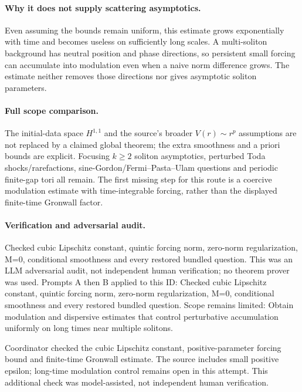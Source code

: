 \documentclass[11pt]{article}
\begin{document}
\paragraph{Why it does not supply scattering asymptotics.}Even assuming the bounds remain uniform, this estimate grows exponentially with time and becomes useless on sufficiently long scales. A multi-soliton background has neutral position and phase directions, so persistent small forcing can accumulate into modulation even when a naive norm difference grows. The estimate neither removes those directions nor gives asymptotic soliton parameters.
\paragraph{Full scope comparison.}The initial-data space \(H^{1,1}\) and the source's broader \(V(r)\sim r^p\) assumptions are not replaced by a claimed global theorem; the extra smoothness and a priori bounds are explicit. Focusing \(k\ge2\) soliton asymptotics, perturbed Toda shocks/rarefactions, sine-Gordon/Fermi--Pasta--Ulam questions and periodic finite-gap tori all remain. The first missing step for this route is a coercive modulation estimate with time-integrable forcing, rather than the displayed finite-time Gronwall factor.

\paragraph{Verification and adversarial audit.}
Checked cubic Lipschitz constant, quintic forcing norm, zero-norm regularization, M=0, conditional smoothness and every restored bundled question. This was an LLM adversarial audit, not independent human verification; no theorem prover was used. Prompts A then B applied to this ID: Checked cubic Lipschitz constant, quintic forcing norm, zero-norm regularization, M=0, conditional smoothness and every restored bundled question. Scope remains limited: Obtain modulation and dispersive estimates that control perturbative accumulation uniformly on long times near multiple solitons.

Coordinator checked the cubic Lipschitz constant, positive-parameter forcing bound and finite-time Gronwall estimate. The source includes small positive epsilon; long-time modulation control remains open in this attempt. This additional check was model-assisted, not independent human verification.
\end{document}
